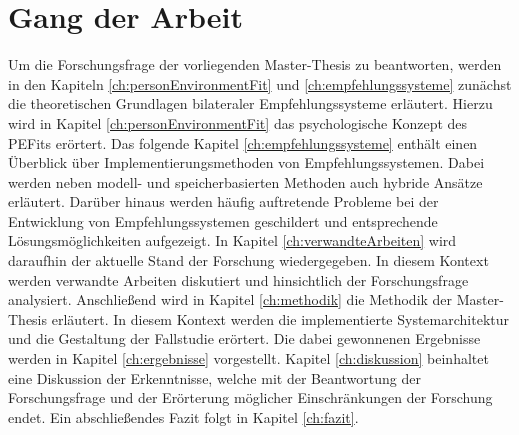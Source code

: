 \section{Gang der Arbeit}
\label{sec:intro:gangDerArbeit}
Um die Forschungsfrage der vorliegenden Master-Thesis zu beantworten, werden in den Kapiteln \ref{ch:personEnvironmentFit} und \ref{ch:empfehlungssysteme} zunächst die theoretischen Grundlagen bilateraler Empfehlungssysteme erläutert. Hierzu wird in Kapitel \ref{ch:personEnvironmentFit} das psychologische Konzept des \acp{PEFit} erörtert. Das folgende Kapitel \ref{ch:empfehlungssysteme} enthält einen Überblick über Implementierungsmethoden von Empfehlungssystemen. Dabei werden neben modell- und speicherbasierten Methoden auch hybride Ansätze erläutert. Darüber hinaus werden häufig auftretende Probleme bei der Entwicklung von Empfehlungssystemen geschildert und entsprechende Lösungsmöglichkeiten aufgezeigt. In Kapitel \ref{ch:verwandteArbeiten} wird daraufhin der aktuelle Stand der Forschung wiedergegeben. In diesem Kontext werden verwandte Arbeiten diskutiert und hinsichtlich der Forschungsfrage analysiert. Anschließend wird in Kapitel \ref{ch:methodik} die Methodik der Master-Thesis erläutert. In diesem Kontext werden die implementierte Systemarchitektur und die Gestaltung der Fallstudie erörtert. Die dabei gewonnenen Ergebnisse werden in Kapitel \ref{ch:ergebnisse} vorgestellt. Kapitel \ref{ch:diskussion} beinhaltet eine Diskussion der Erkenntnisse, welche mit der Beantwortung der Forschungsfrage und der Erörterung möglicher Einschränkungen der Forschung endet. Ein abschließendes Fazit folgt in Kapitel \ref{ch:fazit}.
